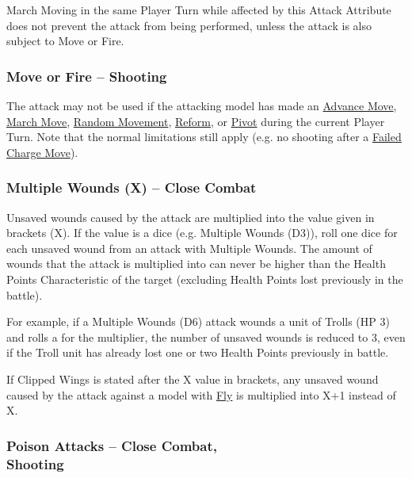 March Moving in the same Player Turn while affected by this Attack Attribute does not prevent the attack from being performed, unless the attack is also subject to Move or Fire.

\subsubsection{Move or Fire -- Shooting}
\idx[main=y]{\moveorfire}\label{move_or_fire}

The attack may not be used if the attacking model has made an \hyperref[advance_move]{Advance Move}, \hyperref[march_move]{March Move}, \hyperref[random_movement]{Random Movement}, \hyperref[reform]{Reform}, or \hyperref[pivots_and_wheels]{Pivot} during the current Player Turn. Note that the normal limitations still apply (e.g. no shooting after a \hyperref[failed_charge]{Failed Charge Move}).

\subsubsection{Multiple Wounds (X) -- Close Combat}
\idx[main=y]{\multiplewounds{}{}}\label{multiple_wounds}

Unsaved wounds caused by the attack are multiplied into the value given in brackets (X). If the value is a dice (e.g. Multiple Wounds (D3)), roll one dice for each unsaved wound from an attack with Multiple Wounds. The amount of wounds that the attack is multiplied into can never be higher than the Health Points Characteristic of the target (excluding Health Points lost previously in the battle).

For example, if a Multiple Wounds (D6) attack wounds a unit of Trolls (HP 3) and rolls a  for the multiplier, the number of unsaved wounds is reduced to 3, even if the Troll unit has already lost one or two Health Points previously in battle.

If Clipped Wings is stated after the X value in brackets, any unsaved wound caused by the attack against a model with \hyperref[fly]{Fly} is multiplied into X+1 instead of X.

\subsubsection[Poison Attacks -- Close Combat, Shooting]{Poison Attacks -- Close Combat,\\ Shooting}
\idx[main=y]{\poisonattacks}\label{poison_attacks}

